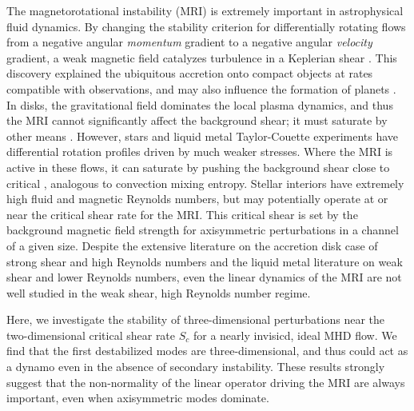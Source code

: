 \documentclass[aps,prl,reprint,superscriptaddress]{revtex4-1}
\begin{document}
\pacs{}
\maketitle

The magnetorotational instability (MRI) is extremely important in astrophysical fluid dynamics.
By changing the stability criterion for differentially rotating flows from a negative angular \emph{momentum} gradient to a negative angular \emph{velocity} gradient, a weak magnetic field catalyzes turbulence in a Keplerian shear \citep[e.g.][]{1998RvMP...70....1B,2010RSPTA.368.1607J}.
This discovery explained the ubiquitous accretion onto compact objects at rates compatible with observations, and may also influence the formation of planets \citep[e.g.][]{2007Natur.448.1022J}.
In disks, the gravitational field dominates the local plasma dynamics, and thus the MRI cannot significantly affect the background shear; it must saturate by other means \citep{2018MNRAS.474.3451X}.
However, stars and liquid metal Taylor-Couette experiments have differential rotation profiles driven by much weaker stresses.
Where the MRI is active in these flows, it can saturate by pushing the background shear close to critical \citep{2015RSPSA.47140699V,2017ApJ...841....1C,2017ApJ...841....2C}, analogous to convection mixing entropy.
Stellar interiors have extremely high fluid and magnetic Reynolds numbers, but may potentially operate at or near the critical shear rate for the MRI.
This critical shear is set by the background magnetic field strength for axisymmetric perturbations in a channel of a given size.
Despite the extensive literature on the accretion disk case of strong shear and high Reynolds numbers and the liquid metal literature on weak shear and lower Reynolds numbers, even the linear dynamics of the MRI are not well studied in the weak shear, high Reynolds number regime.

Here, we investigate the stability of three-dimensional perturbations near the two-dimensional critical shear rate $S_c$ for a nearly invisicd, ideal MHD flow.
We find that the first destabilized modes are three-dimensional, and thus could act as a dynamo even in the absence of secondary instability.
These results strongly suggest that the non-normality of the linear operator driving the MRI are always important, even when axisymmetric modes dominate.
\end{document}
